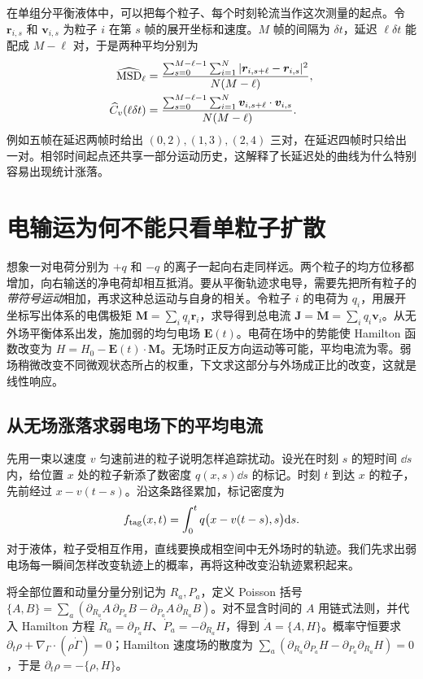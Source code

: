 在单组分平衡液体中，可以把每个粒子、每个时刻轮流当作这次测量的起点。令 $\bm r_{i,s}$ 和 $\bm v_{i,s}$ 为粒子 $i$ 在第 $s$ 帧的展开坐标和速度。$M$ 帧的间隔为 $\delta t$，延迟 $\ell\delta t$ 能配成 $M-\ell$ 对，于是两种平均分别为
\begin{align}
 \widehat{\mathrm{MSD}}_\ell
 &=\frac{\sum_{s=0}^{M-\ell-1}\sum_{i=1}^N
             |\bm r_{i,s+\ell}-\bm r_{i,s}|^2}{N(M-\ell)},\notag\\
 \widehat C_v(\ell\delta t)
 &=\frac{\sum_{s=0}^{M-\ell-1}\sum_{i=1}^N
             \bm v_{i,s+\ell}\cdot\bm v_{i,s}}{N(M-\ell)} .
\end{align}
例如五帧在延迟两帧时给出 $(0,2),(1,3),(2,4)$ 三对，在延迟四帧时只给出一对。相邻时间起点还共享一部分运动历史，这解释了长延迟处的曲线为什么特别容易出现统计涨落。

\section{电输运为何不能只看单粒子扩散}
想象一对电荷分别为 $+q$ 和 $-q$ 的离子一起向右走同样远。两个粒子的均方位移都增加，向右输送的净电荷却相互抵消。要从平衡轨迹求电导，需要先把所有粒子的\emph{带符号运动}相加，再求这种总运动与自身的相关。令粒子 $i$ 的电荷为 $q_i$，用展开坐标写出体系的电偶极矩 $\bm M=\sum_iq_i\bm r_i$，求导得到总电流 $\bm J=\dot{\bm M}=\sum_iq_i\bm v_i$。从无外场平衡体系出发，施加弱的均匀电场 $\bm E(t)$。电荷在场中的势能使 Hamilton 函数改变为 $H=H_0-\bm E(t)\cdot\bm M$。无场时正反方向运动等可能，平均电流为零。弱场稍微改变不同微观状态所占的权重，下文求这部分与外场成正比的改变，这就是线性响应。

\subsection{从无场涨落求弱电场下的平均电流}
先用一束以速度 $v$ 匀速前进的粒子说明怎样追踪扰动。设光在时刻 $s$ 的短时间 $\dd s$ 内，给位置 $x$ 处的粒子新添了数密度 $q(x,s)\dd s$ 的标记。时刻 $t$ 到达 $x$ 的粒子，先前经过 $x-v(t-s)$。沿这条路径累加，标记密度为
\[
 f_{\rm tag}(x,t)=\int_0^t q\bigl(x-v(t-s),s\bigr)\mathrm{d} s .
\]
对于液体，粒子受相互作用，直线要换成相空间中无外场时的轨迹。我们先求出弱电场每一瞬间怎样改变轨迹上的概率，再将这种改变沿轨迹累积起来。

将全部位置和动量分量分别记为 $R_a,P_a$，定义 Poisson 括号 $\{A,B\}=\sum_a(\partial_{R_a}A\,\partial_{P_a}B-\partial_{P_a}A\,\partial_{R_a}B)$。对不显含时间的 $A$ 用链式法则，并代入 Hamilton 方程 $\dot R_a=\partial_{P_a}H$、$\dot P_a=-\partial_{R_a}H$，得到 $\dot A=\{A,H\}$。概率守恒要求 $\partial_t\rho+\nabla_\Gamma\cdot(\rho\dot\Gamma)=0$；Hamilton 速度场的散度为 $\sum_a(\partial_{R_a}\partial_{P_a}H-\partial_{P_a}\partial_{R_a}H)=0$，于是 $\partial_t\rho=-\{\rho,H\}$。

